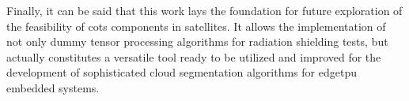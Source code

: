 {Finally, it can be said that this work lays the foundation for future exploration of the feasibility of \gls{cots} components in satellites.
It allows the implementation of not only dummy tensor processing algorithms for radiation shielding tests,
but actually constitutes a versatile tool ready to be utilized and improved
for the development of sophisticated cloud segmentation algorithms for \gls{edgetpu} embedded systems.

}